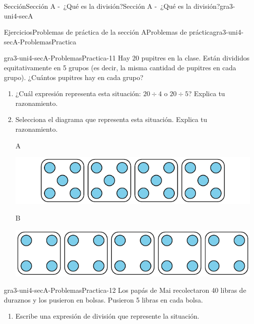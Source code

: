 \documentclass[twoside,10pt,]{article}
\begin{document}
\begin{sectionptx}{Sección}{Sección A -~¿Qué es la división?}{}{Sección A -~¿Qué es la división?}{}{}{gra3-uni4-secA}
\begin{exercises-subsection}{Ejercicios}{Problemas de práctica de la sección A}{}{Problemas de práctica}{}{}{gra3-uni4-secA-ProblemasPractica}
\begin{divisionexercise}{9}{}{}{gra3-uni4-secA-ProblemasPractica-11}
Hay 20 pupitres en la clase. Están divididos equitativamente en 5 grupos (es decir, la misma cantidad de pupitres en cada grupo). ¿Cuántos pupitres hay en cada grupo?%
\par
%
\begin{enumerate}[label={(\alph*)}]
\item{}¿Cuál expresión representa esta situación: \(20\div 4\) o \(20\div 5\)? Explica tu razonamiento.%
\item{}Selecciona el diagrama que representa esta situación. Explica tu razonamiento.%
\begin{sidebyside}{2}{0}{0}{0}%
\begin{sbspanel}{0.07}%
A%
\end{sbspanel}%
\begin{sbspanel}{0.93}%
\includegraphics[width=\linewidth]{external/svg-source/tikz-file-151671.pdf}
\end{sbspanel}%
\end{sidebyside}%
\begin{sidebyside}{2}{0}{0}{0}%
\begin{sbspanel}{0.07}%
B%
\end{sbspanel}%
\begin{sbspanel}{0.93}%
\includegraphics[width=\linewidth]{external/svg-source/tikz-file-151672.pdf}
\end{sbspanel}%
\end{sidebyside}%
\end{enumerate}
%
\end{divisionexercise}%
\begin{divisionexercise}{10}{}{}{gra3-uni4-secA-ProblemasPractica-12}%
Los papás de Mai recolectaron 40 libras de duraznos y los pusieron en bolsas. Pusieron 5 libras en cada bolsa.%
\par
%
\begin{enumerate}[label={(\alph*)}]
\item{}Escribe una expresión de división que represente la situación.%

\end{enumerate}
\end{divisionexercise}
\end{exercises-subsection}
\end{sectionptx}
\end{document}
